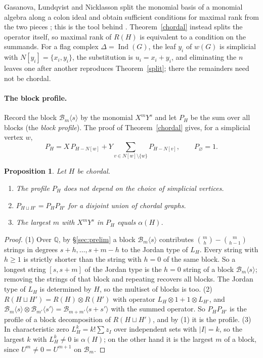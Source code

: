 \documentclass[11pt,a4paper]{article}
\newtheorem{proposition}[theorem]{Proposition}
\theoremstyle{definition}
\newcommand{\B}{\mathcal B}
\begin{document}
Gasanova, Lundqvist and Nicklasson split the monomial basis of a monomial algebra along a colon ideal and obtain sufficient conditions for maximal rank from the two pieces \cite[Theorem~1]{GLN}; this is the tool behind \cite[Proposition~3.5]{HN}. Theorem~\ref{chordal} instead splits the operator itself, so maximal rank of $R(H)$ is equivalent to a condition on the summands. For a flag complex $\Delta=\operatorname{Ind}(G)$, the leaf $y_i$ of $w(G)$ is simplicial with $N[y_i]=\{x_i,y_i\}$, the substitution is $u_i=x_i+y_i$, and eliminating the $n$ leaves one after another reproduces Theorem~\ref{split}; there the remainders need not be chordal.

\paragraph{The block profile.}
Record the block $\B_m\langle s\rangle$ by the monomial $X^mY^s$ and let $P_H$ be the sum over all blocks (the \emph{block profile}). The proof of Theorem~\ref{chordal} gives, for a simplicial vertex $w$,
\begin{equation}\label{recursion}
 P_H=X\,P_{H-N[w]}+Y\!\!\sum_{v\in N[w]\setminus\{w\}}\!\!P_{H-N[v]},\qquad P_\varnothing=1 .
\end{equation}

\begin{proposition}\label{invariant}
Let $H$ be chordal.
\begin{enumerate}
\item The profile $P_H$ does not depend on the choice of simplicial vertices.
\item $P_{H\sqcup H'}=P_HP_{H'}$ for a disjoint union of chordal graphs.
\item The largest $m$ with $X^mY^s$ in $P_H$ equals $\alpha(H)$.
\end{enumerate}
\end{proposition}
\begin{proof}
(1) Over $\mathbb Q$, by \S\ref{sec:prelim} a block $\B_m\langle s\rangle$ contributes $\binom mh-\binom m{h-1}$ strings in degrees $s+h,\dots,s+m-h$ to the Jordan type of $L_H$. Every string with $h\ge1$ is strictly shorter than the string with $h=0$ of the same block. So a longest string $[s,s+m]$ of the Jordan type is the $h=0$ string of a block $\B_m\langle s\rangle$; removing the strings of that block and repeating recovers all blocks. The Jordan type of $L_H$ is determined by $H$, so the multiset of blocks is too.
(2) $R(H\sqcup H')=R(H)\otimes R(H')$ with operator $L_H\otimes1+1\otimes L_{H'}$, and $\B_m\langle s\rangle\otimes\B_{m'}\langle s'\rangle=\B_{m+m'}\langle s+s'\rangle$ with the summed operator. So $P_HP_{H'}$ is the profile of a block decomposition of $R(H\sqcup H')$, and by (1) it is the profile.
(3) In characteristic zero $L_H^k=k!\sum z_I$ over independent sets with $|I|=k$, so the largest $k$ with $L_H^k\ne0$ is $\alpha(H)$; on the other hand it is the largest $m$ of a block, since $U^m\ne0=U^{m+1}$ on $\B_m$.
\end{proof}
\end{document}

